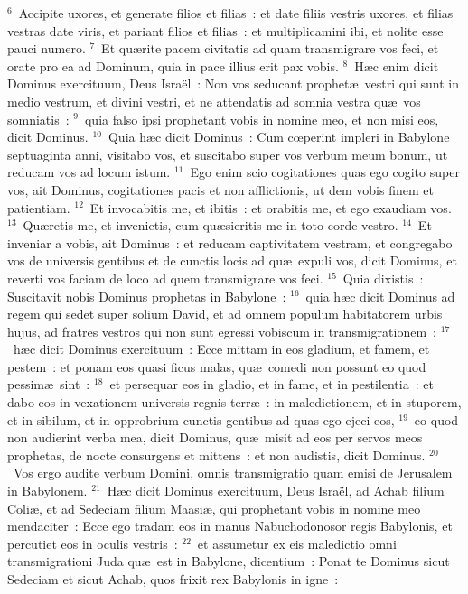 ${}^{6}$~Accipite uxores, et generate filios et filias~: et date filiis vestris uxores, et filias vestras date viris, et pariant filios et filias~: et multiplicamini ibi, et nolite esse pauci numero.
${}^{7}$~Et qu\ae rite pacem civitatis ad quam transmigrare vos feci, et orate pro ea ad Dominum, quia in pace illius erit pax vobis.
${}^{8}$~H\ae c enim dicit Dominus exercituum, Deus Isra\"el~: Non vos seducant prophet\ae\ vestri qui sunt in medio vestrum, et divini vestri, et ne attendatis ad somnia vestra qu\ae\ vos somniatis~:
${}^{9}$~quia falso ipsi prophetant vobis in nomine meo, et non misi eos, dicit Dominus.
${}^{10}$~Quia h\ae c dicit Dominus~: Cum cœperint impleri in Babylone septuaginta anni, visitabo vos, et suscitabo super vos verbum meum bonum, ut reducam vos ad locum istum.
${}^{11}$~Ego enim scio cogitationes quas ego cogito super vos, ait Dominus, cogitationes pacis et non afflictionis, ut dem vobis finem et patientiam.
${}^{12}$~Et invocabitis me, et ibitis~: et orabitis me, et ego exaudiam vos.
${}^{13}$~Qu\ae retis me, et invenietis, cum qu\ae sieritis me in toto corde vestro.
${}^{14}$~Et inveniar a vobis, ait Dominus~: et reducam captivitatem vestram, et congregabo vos de universis gentibus et de cunctis locis ad qu\ae\ expuli vos, dicit Dominus, et reverti vos faciam de loco ad quem transmigrare vos feci.
${}^{15}$~Quia dixistis~: Suscitavit nobis Dominus prophetas in Babylone~:
${}^{16}$~quia h\ae c dicit Dominus ad regem qui sedet super solium David, et ad omnem populum habitatorem urbis hujus, ad fratres vestros qui non sunt egressi vobiscum in transmigrationem~:
${}^{17}$~h\ae c dicit Dominus exercituum~: Ecce mittam in eos gladium, et famem, et pestem~: et ponam eos quasi ficus malas, qu\ae\ comedi non possunt eo quod pessim\ae\ sint~:
${}^{18}$~et persequar eos in gladio, et in fame, et in pestilentia~: et dabo eos in vexationem universis regnis terr\ae~: in maledictionem, et in stuporem, et in sibilum, et in opprobrium cunctis gentibus ad quas ego ejeci eos,
${}^{19}$~eo quod non audierint verba mea, dicit Dominus, qu\ae\ misit ad eos per servos meos prophetas, de nocte consurgens et mittens~: et non audistis, dicit Dominus.
${}^{20}$~Vos ergo audite verbum Domini, omnis transmigratio quam emisi de Jerusalem in Babylonem.
${}^{21}$~H\ae c dicit Dominus exercituum, Deus Isra\"el, ad Achab filium Coli\ae , et ad Sedeciam filium Maasi\ae , qui prophetant vobis in nomine meo mendaciter~: Ecce ego tradam eos in manus Nabuchodonosor regis Babylonis, et percutiet eos in oculis vestris~:
${}^{22}$~et assumetur ex eis maledictio omni transmigrationi Juda qu\ae\ est in Babylone, dicentium~: Ponat te Dominus sicut Sedeciam et sicut Achab, quos frixit rex Babylonis in igne~:
